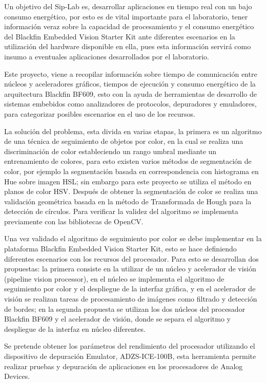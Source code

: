 Un objetivo del Sip-Lab es, desarrollar aplicaciones en tiempo real con un bajo consumo energético, por esto es de vital importante para el laboratorio, tener información veraz sobre la capacidad de procesamiento y el consumo energético del Blackfin Embedded Vision Starter Kit ante diferentes escenarios en la utilización del hardware disponible en ella, pues esta información servirá como insumo a eventuales aplicaciones desarrollados por el laboratorio.

Este proyecto, viene a recopilar información sobre tiempo de comunicación entre núcleos y aceleradores gráficos, tiempos de ejecución y consumo energético de la arquitectura Blackfin BF609, esto con la ayuda de herramientas de desarrollo de sistemas embebidos como analizadores de protocolos, depuradores y emuladores, para categorizar posibles escenarios en el uso de los recursos. 

La solución del problema, esta divida en varias etapas, la primera es un algoritmo de una técnica de seguimiento de objetos por color, en la cual se realiza una discriminación de color estableciendo un rango umbral mediante un entrenamiento de colores, para esto existen varios métodos de segmentación de color, por ejemplo la segmentación basada en correspondencia con histograma en Hue sobre imagen HSL\cite{sevilla}; sin embargo para este proyecto se utiliza el método en planos de color HSV. Después de obtener la segmentación de color se realiza una validación geométrica basada en la método de Transformada de Hough para la detección de círculos. Para verificar la validez del algoritmo se implementa previamente con las bibliotecas de OpenCV\cite{opencv2014}.

Una vez validado el algoritmo de seguimiento por color se debe implementar en la plataforma Blackfin Embedded Vision Starter Kit, esto se hace definiendo diferentes escenarios con los recursos del procesador. Para esto se desarrollan dos propuestas: la primera consiste en la utilizar de un núcleo y acelerador de visión (pipeline vision processor)\cite{blackfin2014}, en el núcleo se implementa el algoritmo de seguimiento por color y el despliegue de la interfaz gráfica, y en el acelerador de visión se realizan tareas de procesamiento de imágenes como filtrado y detección de bordes; en la segunda propuesta se utilizan los dos núcleos del procesador Blackfin BF609 \cite{blackfin2014} y el acelerador de visión, donde se separa el algoritmo y despliegue de la interfaz en núcleo diferentes.  

Se pretende obtener los parámetros del rendimiento del procesador utilizando el dispositivo de depuración Emulator, ADZS-ICE-100B\cite{ice100}, esta herramienta permite realizar pruebas y depuración de aplicaciones en los procesadores de Analog Devices.   
\\
\\
\\

